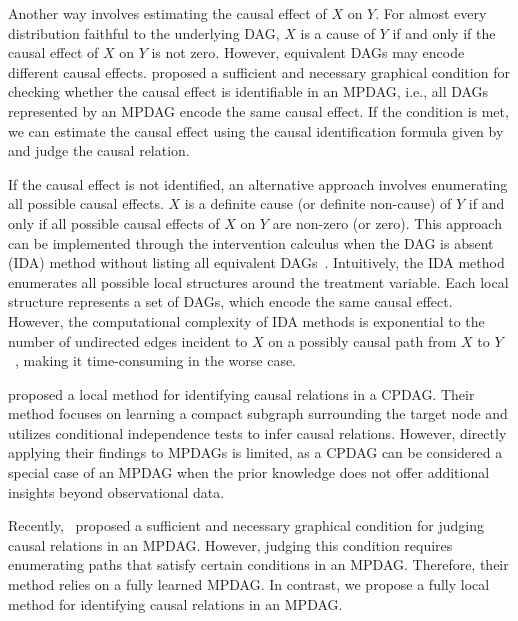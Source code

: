 \documentclass{article}
\begin{document}
Another way involves estimating the causal effect of $X$ on $Y.$ 
For almost every distribution faithful to the underlying DAG, $X$ is a cause of $Y$ if and only if the causal effect of $X$ on $Y$ is not zero.
However, equivalent DAGs may encode different causal effects.
\citet{perkovic2020identifying} proposed a sufficient and necessary graphical condition for checking whether the causal effect is identifiable in an MPDAG, i.e., all DAGs represented by an MPDAG encode the same causal effect.
If the condition is met, we can estimate the causal effect using the causal identification formula given by~\citet{perkovic2020identifying} and judge the causal relation.

If the causal effect is not identified, an alternative approach involves enumerating all possible causal effects. $X$ is a definite cause (or definite non-cause) of $Y$ if and only if all possible causal effects of $X$ on $Y$ are non-zero (or zero).
This approach can be implemented through the intervention calculus when the DAG is absent (IDA) method without listing all equivalent DAGs~\citep{maathuis2009estimating, perkovic2017interpreting, nandy2017estimating, fang2020ida, liu2020collapsible, liu2020local, witte2020efficient, guo2021minimal}.
Intuitively, the IDA method enumerates all possible local structures around the treatment variable.
Each local structure represents a set of DAGs, which encode the same causal effect.
However, the computational complexity of IDA methods is exponential to the number of undirected edges incident to $X$ on a possibly causal path from $X$ to $Y$~\citep{guo2021minimal}, making it time-consuming in the worse case.

\citet{fang2022local} proposed a local method for identifying causal relations in a CPDAG. Their method focuses on learning a compact subgraph surrounding the target node and utilizes conditional independence tests to infer causal relations. However, directly applying their findings to MPDAGs is limited, as a CPDAG can be considered a special case of an MPDAG when the prior knowledge does not offer additional insights beyond observational data.

Recently,~\citet{zuo2022counterfactual} proposed a sufficient and necessary graphical condition for judging causal relations in an MPDAG.
However, judging this condition requires enumerating paths that satisfy certain conditions in an MPDAG.
Therefore, their method relies on a fully learned MPDAG.
In contrast, we propose a fully local method for identifying causal relations in an MPDAG.
\end{document}
